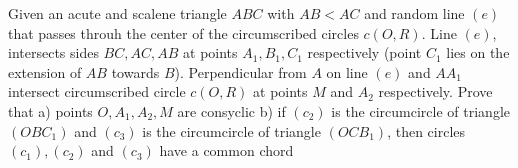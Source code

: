 Given an acute and scalene triangle $ABC$ with $AB<AC$ and random line $(e)$ that passes throuh the center of the circumscribed circles $c(O,R)$. Line $(e)$, intersects sides $BC,AC,AB$ at points $A_1,B_1,C_1$ respectively (point $C_1$ lies on the extension of $AB$ towards $B$). Perpendicular from $A$ on line $(e)$ and $AA_1$ intersect circumscribed circle $c(O,R)$ at points $M$ and $A_2$ respectively. Prove that
a) points $O,A_1,A_2, M$ are consyclic
b) if $(c_2)$ is the circumcircle of triangle $(OBC_1)$ and $(c_3)$ is the circumcircle of triangle $(OCB_1)$, then circles $(c_1),(c_2)$ and $(c_3)$ have a common chord